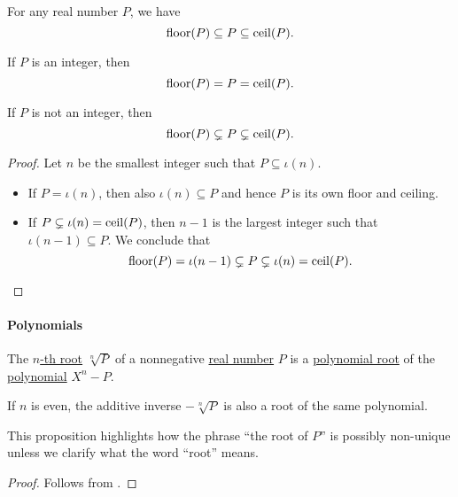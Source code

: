 \begin{proposition}\label{thm:real_floor_ceiling_interval}
  For any real number \( P \), we have
  \begin{equation*}
    \operatorname{floor}(P) \subseteq P \subseteq \operatorname{ceil}(P).
  \end{equation*}

  \begin{thmenum}
     If \( P \) is an integer, then
    \begin{equation*}
      \operatorname{floor}(P) = P = \operatorname{ceil}(P).
    \end{equation*}

     If \( P \) is not an integer, then
    \begin{equation*}
      \operatorname{floor}(P) \subsetneq P \subsetneq \operatorname{ceil}(P).
    \end{equation*}
  \end{thmenum}
\end{proposition}
\begin{proof}
  Let \( n \) be the smallest integer such that \( P \subseteq \iota(n) \).
  \begin{itemize}
    \item If \( P = \iota(n) \), then also \( \iota(n) \subseteq P \) and hence \( P \) is its own floor and ceiling.
    \item If \( P \subsetneq \iota(n) = \operatorname{ceil}(P) \), then \( n - 1 \) is the largest integer such that \( \iota(n - 1) \subseteq P \). We conclude that
    \begin{equation*}
      \operatorname{floor}(P) = \iota(n - 1) \subsetneq P \subsetneq \iota(n) = \operatorname{ceil}(P).
    \end{equation*}
  \end{itemize}
\end{proof}

\paragraph{Polynomials}

\begin{proposition}\label{thm:nth_root_polynomial}
  The \hyperref[def:nth_root]{\( n \)-th root} \( \sqrt[n]{ P } \) of a nonnegative \hyperref[def:real_numbers]{real number} \( P \) is a \hyperref[def:polynomial_root]{polynomial root} of the \hyperref[def:polynomial_algebra/polynomials]{polynomial} \( X^n - P \).

  If \( n \) is even, the additive inverse \( -\sqrt[n]{ P } \) is also a root of the same polynomial.
\end{proposition}
\begin{comments}
  \item This proposition highlights how the phrase \enquote{the root of \( P \)} is possibly non-unique unless we clarify what the word \enquote{root} means.
\end{comments}
\begin{proof}
  Follows from .
\end{proof}

